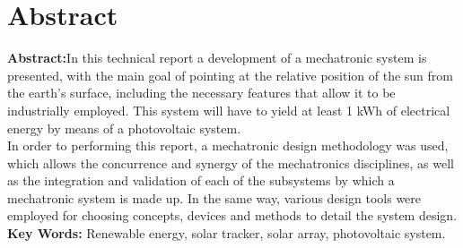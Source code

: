 \chapter{Abstract}

\textbf{Abstract:}In this technical report a development of a mechatronic system is presented, with the main goal of pointing at the relative position of the sun from the earth’s surface, including the necessary features that allow it to be industrially employed. This system will have to yield at least 1 kWh of electrical energy by means of a photovoltaic system.\\

In order to performing this report, a mechatronic design methodology was used, which allows the concurrence and synergy of the mechatronics disciplines, as well as the integration and validation of each of the subsystems by which a mechatronic system is made up. In the same way, various design tools were employed for choosing concepts, devices and methods to detail the system design.\\


\textbf{Key Words:} Renewable energy, solar tracker, solar array, photovoltaic system. \\



\endinput 